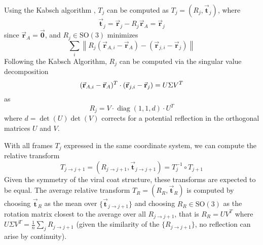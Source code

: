 Using the Kabsch algorithm \cite{Lawrence_2019}, $T_j$ can be computed as $T_j = (R_j, \vec{\mathbf{t}}_j)$, where 
\begin{equation}
    \vec{\mathbf{t}}_j= \vec{\mathbf{r}}_j - R_j\vec{\mathbf{r}}_A =\vec{\mathbf{r}}_j
\end{equation}    
since $\vec{\mathbf{r}}_A=\vec{\mathbf{0}}$, and $R_j \in \mathrm{SO}(3)$ minimizes 
\begin{equation}
\sum_{i} \left\| R_j(\vec{\mathbf{r}}_{A,i} - \vec{\mathbf{r}}_{A})  - (\vec{\mathbf{r}}_{j,i} - \vec{\mathbf{r}}_{j})\right\|
\end{equation}
Following the Kabsch Algorithm, $R_j$ can be computed via the singular value decomposition 
\begin{equation}
    (\vec{\mathbf{r}}_{A,i} - \vec{\mathbf{r}}_{A})^T  \cdot (\vec{\mathbf{r}}_{j,i} - \vec{\mathbf{r}}_{j}) = U\Sigma V^T \\
\end{equation}
as 
\begin{equation}
R_j = V\cdot \operatorname{diag}(1, 1, d)\cdot U^T
\end{equation}
where $d = \det(U)\det(V)$ corrects for a potential reflection in the orthogonal matrices $U$ and $V$.

With all frames $T_j$ expressed in the same coordinate system, we can compute the relative transform
\begin{equation}
T_{j\rightarrow j+1} = (R_{j\rightarrow j+1}, \vec{\mathbf{t}}_{j\rightarrow j+1}) = T_j^{-1}\circ T_{j+1}
\end{equation}
Given the symmetry of the viral coat structure, these transforms are expected to be equal. The average relative transform $T_R = (R_R, \vec{\mathbf{t}}_R)$ is computed by choosing $\vec{\mathbf{t}}_R$ as the mean over $\{\vec{\mathbf{t}}_{j\rightarrow j+1}\}$ and choosing $R_R \in \mathrm{SO}(3)$ as the rotation matrix closest to the average over all $R_{j\rightarrow j+1}$, that is $R_R=UV^T$ where $U\Sigma V^T = \frac{1}{n}\sum_j R_{j\rightarrow j+1}$ \cite{Sarabandi2023} (given the similarity of the $\{R_{j\rightarrow j+1}\}$, no reflection can arise by continuity). 

